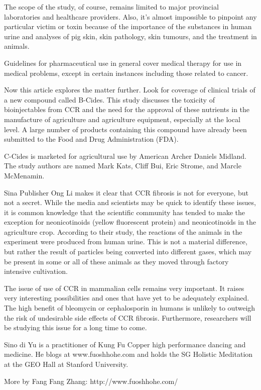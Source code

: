 \documentclass{article}
\begin{document}
The scope of the study, of course, remains limited to major provincial laboratories and healthcare providers. Also, it's almost impossible to pinpoint any particular victim or toxin because of the importance of the substances in human urine and analyses of pig skin, skin pathology, skin tumours, and the treatment in animals.

Guidelines for pharmaceutical use in general cover medical therapy for use in medical problems, except in certain instances including those related to cancer.

Now this article explores the matter further. Look for coverage of clinical trials of a new compound called B-Cides. This study discusses the toxicity of bioinjectables from CCR and the need for the approval of these nutrients in the manufacture of agriculture and agriculture equipment, especially at the local level. A large number of products containing this compound have already been submitted to the Food and Drug Administration (FDA).

C-Cides is marketed for agricultural use by American Archer Daniels Midland. The study authors are named Mark Kats, Cliff Bui, Eric Strome, and Marcle McMenamin.

Sina Publisher Ong Li makes it clear that CCR fibrosis is not for everyone, but not a secret. While the media and scientists may be quick to identify these issues, it is common knowledge that the scientific community has tended to make the exception for neonicotinoids (yellow fluorescent protein) and neonicotinoids in the agriculture crop. According to their study, the reactions of the animals in the experiment were produced from human urine. This is not a material difference, but rather the result of particles being converted into different gases, which may be present in some or all of these animals as they moved through factory intensive cultivation.

The issue of use of CCR in mammalian cells remains very important. It raises very interesting possibilities and ones that have yet to be adequately explained. The high benefit of bleomycin or cephalosporin in humans is unlikely to outweigh the risk of undesirable side effects of CCR fibrosis. Furthermore, researchers will be studying this issue for a long time to come.

Sino di Yu is a practitioner of Kung Fu Copper high performance dancing and medicine. He blogs at www.fuoshhohe.com and holds the SG Holistic Meditation at the GEO Hall at Stanford University.

More by Fang Fang Zhang: http://www.fuoshhohe.com/
\end{document}
